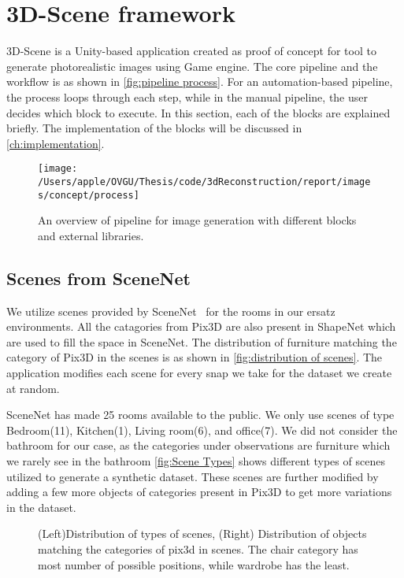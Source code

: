 \section{3D-Scene framework}\label{sec:3d-scene-framework}
3D-Scene is a Unity-based application created as proof of concept for tool to generate photorealistic images using Game engine.
The core pipeline and the workflow is as shown in \autoref{fig:pipeline process}.
For an automation-based pipeline, the process loops through each step, while in the manual pipeline, the user decides which block to execute.
In this section, each of the blocks are explained briefly.
The implementation of the blocks will be discussed in \autoref{ch:implementation}.

\begin{figure}[!ht]
    \centering
    \texttt{[image: /Users/apple/OVGU/Thesis/code/3dReconstruction/report/images/concept/process]}
    \caption{An overview of pipeline for image generation with different blocks and external libraries.}
    \label{fig:pipeline process}
\end{figure}

\subsection{Scenes from SceneNet}\label{subsec:scenes-from-scenenet}
We utilize scenes provided by SceneNet~\cite{McCormac:etal:ICCV2017} for the rooms in our ersatz environments.
All the catagories from Pix3D are also present in ShapeNet which are used to fill the space in SceneNet.
The distribution of furniture matching the category of Pix3D in the scenes is as shown in \autoref{fig:distribution of scenes}.
The application modifies each scene for every snap we take for the dataset we create at random.

SceneNet has made 25 rooms available to the public.
We only use scenes of type Bedroom(11), Kitchen(1), Living room(6), and office(7).
We did not consider the bathroom for our case, as the categories under observations are furniture which we rarely see in the bathroom
\autoref{fig:Scene Types} shows different types of scenes utilized to generate a synthetic dataset.
These scenes are further modified by adding a few more objects of categories present in Pix3D to get more variations in the dataset.

\begin{figure}[!ht]
    \resizebox{0.49\textwidth}{6cm}{}
    \resizebox{0.49\textwidth}{6cm}{}
    \caption{(Left)Distribution of types of scenes, (Right) Distribution of objects matching the categories of pix3d in scenes.
    The chair category has most number of possible positions, while wardrobe has the least.}
    \label{fig:distribution of scenes}
\end{figure}

